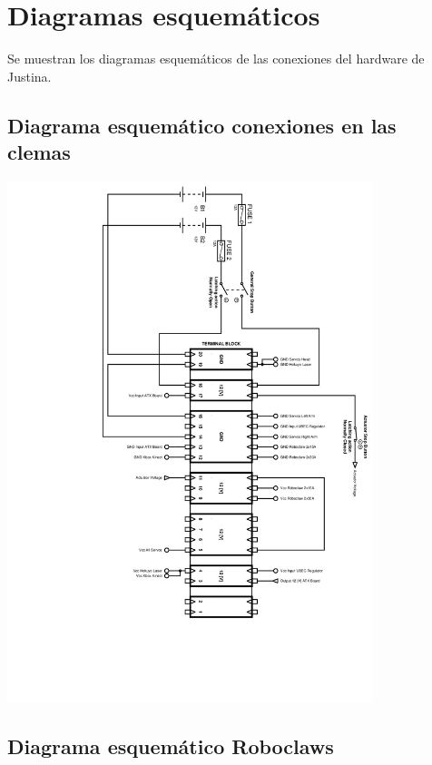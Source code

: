 \documentclass[user_manual.tex]{subfiles}
\begin{document}
\section{Diagramas esquemáticos}
Se muestran los diagramas esquemáticos de las conexiones del hardware de Justina.


\subsection{Diagrama esquemático conexiones en las clemas}

\begin{center}
\includegraphics[width=0.8\textwidth]{Figures/Hardware/Esquematicos/JustinaWiringDiagram.jpg}
\label{fig:Hardware:Partes:Diagrama:Esquematico:General}
\end{center}

\subsection{Diagrama esquemático Roboclaws}
\end{document}
